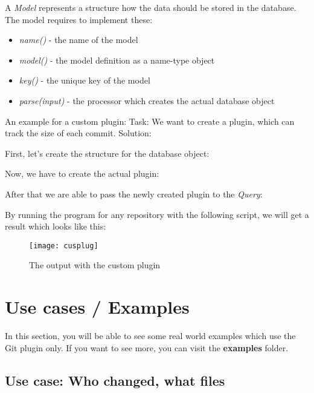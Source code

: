 A \textit{Model} represents a structure how the data should be stored in the database.
The model requires to implement these:
\begin{itemize}
	\item \textit{name()} - the name of the model
	\item \textit{model()} - the model definition as a name-type object 
	\item \textit{key()} - the unique key of the model
	\item \textit{parse(input)} - the processor which creates the actual database object
\end{itemize}

An example for a custom plugin:\newline
Task: We want to create a plugin, which can track the size of each commit. 
Solution:\newline

First, let's create the structure for the database object:


Now, we have to create the actual plugin:


After that we are able to pass the newly created plugin to the \textit{Query}:


By running the program for any repository with the following script, we will get a result which looks like this:




\begin{figure}[H]
	\centering
	\texttt{[image: cusplug]}
	\caption{The output with the custom plugin}
	\label{fig:fig-cusplug}
\end{figure}


\section{Use cases / Examples}

In this section, you will be able to see some real world examples which use the Git plugin only.
If you want to see more, you can visit the \textbf{examples} folder.

\subsection{Use case: Who changed, what files}


